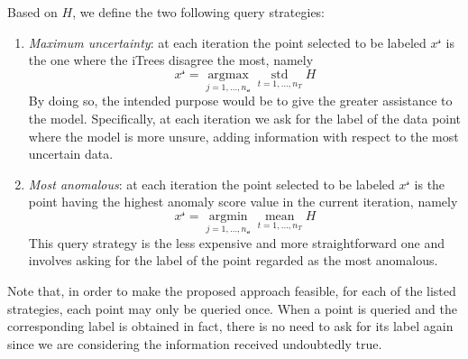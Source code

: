 Based on $H$, we define the two following query strategies:
\begin{enumerate}
    \item \emph{Maximum uncertainty}: at each iteration the point selected to be labeled $x^{\mathcal{s}}$ is the one where the iTrees disagree the most, namely
    \begin{equation}
        x^{\mathcal{s}}=\underset{j =1, \dots,  n_\mathcal{u}}{\operatorname{argmax}} \; \underset{t=1, \dots, n_T}{\text{std}} \; H \label{qs1}
    \end{equation}
    By doing so, the intended purpose would be to give the greater assistance to the model. %
   Specifically, at each iteration we ask for the label of the data point where the model is more unsure, adding information with respect to the most uncertain data.
    \item \emph{Most anomalous}: at each iteration the point selected to be labeled $x^{\mathcal{s}}$ is the point having the highest anomaly score value in the current iteration, namely
    \begin{equation}
        x^{\mathcal{s}}=\underset{j =1, \dots,  n_\mathcal{u}}{\operatorname{argmin}} \; \underset{t=1, \dots, n_T}{\text{mean}} \; H \label{qs2}
    \end{equation}
    This query strategy is the less expensive and more straightforward one and involves asking for the label of the point regarded as the most anomalous.
\end{enumerate}
Note that, in order to make the proposed approach feasible, for each of the listed strategies, each point may only be queried once.  When a point is queried and the corresponding label is obtained in fact, there is no need to ask for its label again since we are considering the information received undoubtedly true.

